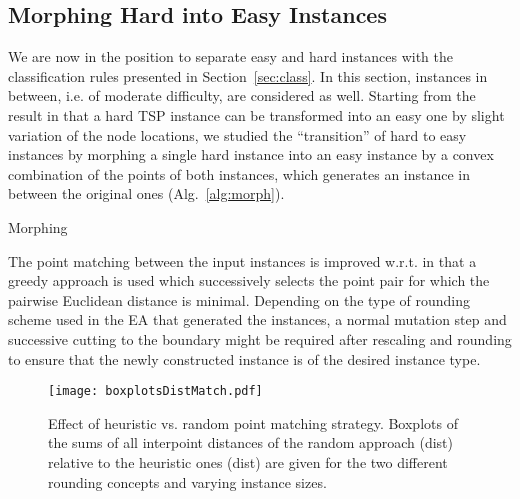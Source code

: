 \documentclass{article}
\begin{document}
\subsection{Morphing Hard into Easy Instances}

We are now in the position to separate easy and hard instances with
the classification rules presented in Section~\ref{sec:class}.  In this
section, instances in between, i.e. of moderate difficulty, are
considered as well. Starting from the result in \cite{EnglertRV07}
that a hard TSP instance can be transformed into an easy one by slight
variation of the node locations, we studied the ``transition'' of hard
to easy instances by morphing a single hard instance into an easy
instance by a convex combination of the points of both instances,
which generates an instance in between the original ones
(Alg.~\ref{alg:morph}).

\begin{algorithm}[h]
  \caption{Morphing}
  \label{alg:morph}
  \begin{algorithmic}
    \State 
    \State 
    \State 
    \State 
    \If{}
    \State 
    \State 
    \EndIf
    \State \Return 
    \EndFunction
  \end{algorithmic}
\end{algorithm}

The point matching between the input instances is improved
w.r.t. \cite{mersmann2012} in that a greedy approach is used which
successively selects the point pair for which the pairwise Euclidean
distance is minimal. Depending on the type of rounding scheme used in
the EA that generated the instances, a normal mutation step and successive cutting to the boundary might be
required after rescaling and rounding to ensure that the newly
constructed instance is of the desired instance type.

\begin{figure}
  \centering
  \texttt{[image: boxplotsDistMatch.pdf]}
  \caption{Effect of heuristic vs. random point matching
    strategy. Boxplots of the sums of all interpoint distances of the
    random approach (dist) relative to the heuristic ones
    (dist) are given for the two different rounding concepts and
    varying instance sizes.}
  \label{fig:effectmatch}
\end{figure}
\end{document}
